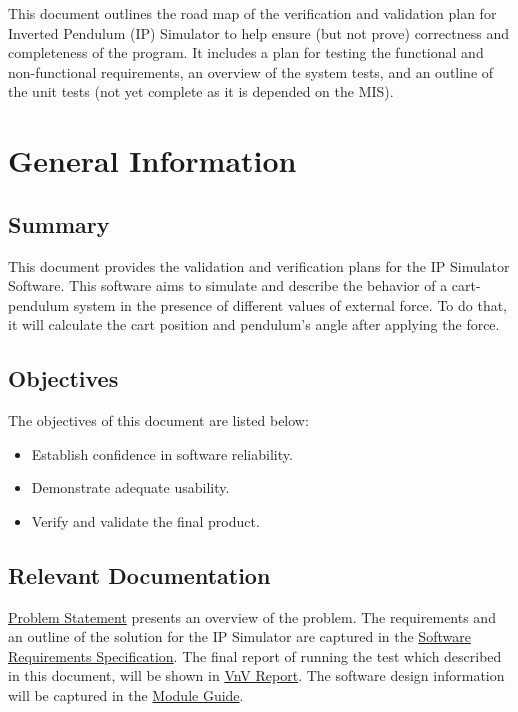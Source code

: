 \documentclass[12pt, titlepage]{article}
\begin{document}

This document outlines the road map of the verification and validation plan for Inverted Pendulum (IP) Simulator to help ensure (but not prove) correctness and completeness of the program.
It includes a plan for testing the functional and non-functional requirements, an overview of the system tests, and an outline of the unit tests (not yet complete as it is depended on the MIS).

\section{General Information}

\subsection{Summary}
This document provides the validation and verification plans for the IP Simulator Software. This software aims to simulate and describe the behavior of a cart-pendulum system in the presence of different values of external force. To do that, it will calculate the cart position and pendulum's angle after applying the force.
\subsection{Objectives}

The objectives of this document are listed below:
\begin{itemize}
\item Establish confidence in software reliability.
\item Demonstrate adequate usability.
\item Verify and validate the final product.
\end{itemize}

\subsection{Relevant Documentation}

\href{https://github.com/MinMah23/CAS741-Project/tree/main/docs/ProblemStatementAndGoals/ProblemStatement.pdf}{Problem Statement} presents an overview of the problem.
The requirements and an outline of the solution for the IP Simulator are captured in the \href{https://github.com/MinMah23/CAS741-Project/tree/main/docs/SRS/SRS.pdf}{Software Requirements Specification}.
The final report of running the test which described in this document, will be shown in \href{https://github.com/Maryamvalian/project741/blob/main/docs/VnVReport/VnVReport.pdf}{VnV Report}.
The software design information will be captured in the \href{https://github.com/MinMah23/CAS741-Project/tree/main/docs/Design}{Module Guide}.
\end{document}
